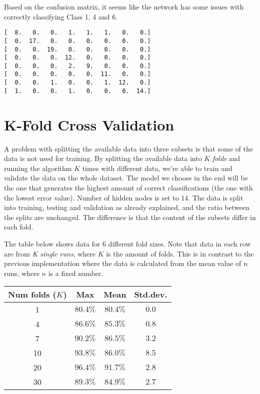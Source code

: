 \documentclass{article}
\begin{document}
\noindent Based on the confusion matrix, it seems like the network has some issues with correctly classifying Class 1, 4 and 6.

\begin{center}
\begin{verbatim}
[  8.   0.   0.   1.   1.   1.   0.   0.]
[  0.  17.   0.   0.   0.   0.   0.   0.]
[  0.   0.  19.   0.   0.   0.   0.   0.]
[  0.   0.   0.  12.   0.   0.   0.   0.]
[  0.   0.   0.   2.   9.   0.   0.   0.]
[  0.   0.   0.   0.   0.  11.   0.   0.]
[  0.   0.   1.   0.   0.   1.  12.   0.]
[  1.   0.   0.   1.   0.   0.   0.  14.]
\end{verbatim}
\end{center}

\section*{K-Fold Cross Validation}

A problem with splitting the available data into three subsets is that some of the data is not used for training. By splitting the available data into $K$ \emph{folds} and running the algorithm $K$ times with different data, we're able to train and validate the data on the whole dataset. The model we choose in the end will be the one that generates the highest amount of correct classifications (the one with the lowest error value). Number of hidden nodes is set to 14. The data is split into training, testing and validation as already explained, and the ratio between the splits are unchanged. The difference is that the content of the subsets differ in each fold.

The table below shows data for 6 different fold sizes. Note that data in each row are from \emph{K single runs}, where $K$ is the amount of folds. This is in contrast to the previous implementation where the data is calculated from the mean value of $n$ runs, where $n$ is a fixed number.

\begin{center}
\begin{tabular}{cccc}
\toprule
Num folds ($K$) & Max & Mean & Std.dev. \\
\midrule
1 & $80.4\%$ & $80.4\%$ & $0.0$\\
4 & $86.6\%$ & $85.3\%$ & $0.8$\\
7 & $90.2\%$ & $86.5\%$ & $3.2$\\
10 & $93.8\%$ & $86.0\%$ & $8.5$\\
20 & $96.4\%$ & $91.7\%$ & $2.8$\\
30 & $89.3\%$ & $84.9\%$ & $2.7$\\
\bottomrule
\end{tabular}
\end{center}
\end{document}
